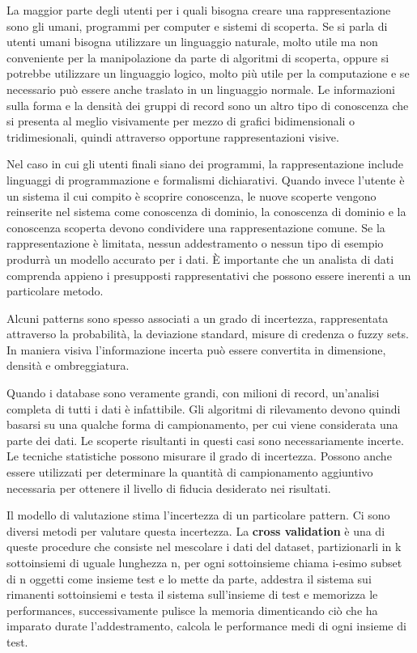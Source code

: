 \documentclass[a4paper]{extarticle}
\begin{document}
La maggior parte degli utenti per i quali bisogna creare una rappresentazione sono gli umani, programmi per computer e sistemi di scoperta. Se si parla di utenti umani bisogna utilizzare un linguaggio naturale, molto utile ma non conveniente per la manipolazione da parte di algoritmi di scoperta, oppure si potrebbe utilizzare un linguaggio logico, molto più utile per la computazione e se necessario può essere anche traslato in un linguaggio normale. Le informazioni sulla forma e la densità dei gruppi di record sono un altro tipo di conoscenza che si presenta al meglio visivamente per mezzo di grafici bidimensionali o tridimesionali, quindi attraverso opportune rappresentazioni visive. 

Nel caso in cui gli utenti finali siano dei programmi, la rappresentazione include linguaggi di programmazione e formalismi dichiarativi. Quando invece l'utente è un sistema il cui compito è scoprire conoscenza, le nuove scoperte vengono reinserite nel sistema come conoscenza di dominio, la conoscenza di dominio e la conoscenza scoperta devono condividere una rappresentazione comune. Se la rappresentazione è limitata, nessun addestramento o nessun tipo di esempio produrrà un modello accurato per i dati. È importante che un analista di dati comprenda appieno i presupposti rappresentativi che possono essere inerenti a un particolare metodo.

Alcuni patterns sono spesso associati a un grado di incertezza, rappresentata attraverso la probabilità, la deviazione standard, misure di credenza o fuzzy sets. In maniera visiva l'informazione incerta può essere convertita in dimensione, densità e ombreggiatura.

Quando i database sono veramente grandi, con milioni di record, un'analisi completa di tutti i dati è infattibile. Gli algoritmi di rilevamento devono quindi basarsi su una qualche forma di campionamento, per cui viene considerata una parte dei dati. Le scoperte risultanti in questi casi sono necessariamente incerte. Le tecniche statistiche possono misurare il grado di incertezza. Possono anche essere utilizzati per determinare la quantità di campionamento aggiuntivo necessaria per ottenere il livello di fiducia desiderato nei risultati.

Il modello di valutazione stima l'incertezza di un particolare pattern. Ci sono diversi metodi per valutare questa incertezza. La \textbf{cross validation} è una di queste procedure che consiste nel mescolare i dati del dataset, partizionarli in k sottoinsiemi di uguale lunghezza n, per ogni sottoinsieme chiama i-esimo subset di n oggetti come insieme test e lo mette da parte, addestra il sistema sui rimanenti sottoinsiemi e testa il sistema sull'insieme di test e memorizza le performances,  successivamente pulisce la memoria dimenticando ciò che ha imparato durate l'addestramento, calcola le performance medi di ogni insieme di test.
\end{document}

